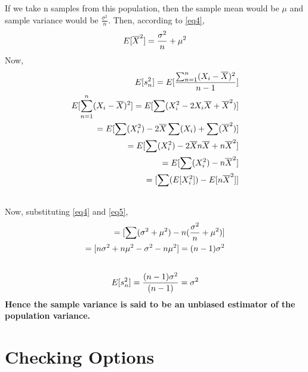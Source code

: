 \documentclass[12pt]{article}
\begin{document}
If we take n samples from this population, then the sample mean would be $\mu$ and sample variance would be $\frac{\sigma^{2}}{n}$. Then, according to \ref{eq4}, \\
\begin{equation} \label{eq5}
    E[\overline{X}^{2}] = \frac{\sigma^{2}}{n} + \mu^{2}\\
\end{equation}
Now, 
\begin{align*}
   E [s^{2}_{n}] = E[\frac{\sum_{n=1}^{n}(X_{i} - \overline{X})^{2}} {n-1}] \\
    \vspace{0.1cm}
    E[\sum_{n=1}^{n}(X_{i} - \overline{X})^{2}] = E[\sum(X_{i}^{2}-2X_{i}\overline{X} + \overline{X}^{2})] \\ \vspace{0.1cm}
    = E[\sum(X_{i}^{2}) - 2\overline{X}\sum(X_{i})+\sum(\overline{X}^{2})] \\
    \vspace{0.1cm}
    = E[\sum(X_{i}^{2}) - 2\overline{X}n\overline{X} + n\overline{X}^{2}] \\
    \vspace{0.1cm}
    = E[\sum(X_{i}^{2}) - n\overline{X}^{2}] \\
    \vspace{0.1cm}
    = [\sum(E[X_{i}^{2}]) - E[n\overline{X}^{2}]] \\
    \vspace{0.1cm}
\end{align*}
Now, substituting \ref{eq4} and \ref{eq5}, \\
\begin{align*}
    = [\sum(\sigma^{2}+\mu^{2}) - n(\frac{\sigma^{2}}{n} + \mu^{2})] \\
    \vspace{0.1cm}
    = [n\sigma^{2} + {n\mu^{2}} - \sigma^{2} - {n\mu^{2}}] = (n-1)\sigma^{2} \\
    \vspace{0.1cm}
\end{align*}
\begin{equation}
     E [s^{2}_{n}] = \frac{(n-1)\sigma^{2}}{(n-1)} = \sigma^{2}\\
\end{equation}
\textbf{Hence the sample variance is said to be an unbiased estimator of the population variance.}
\section{Checking Options}
\end{document}
